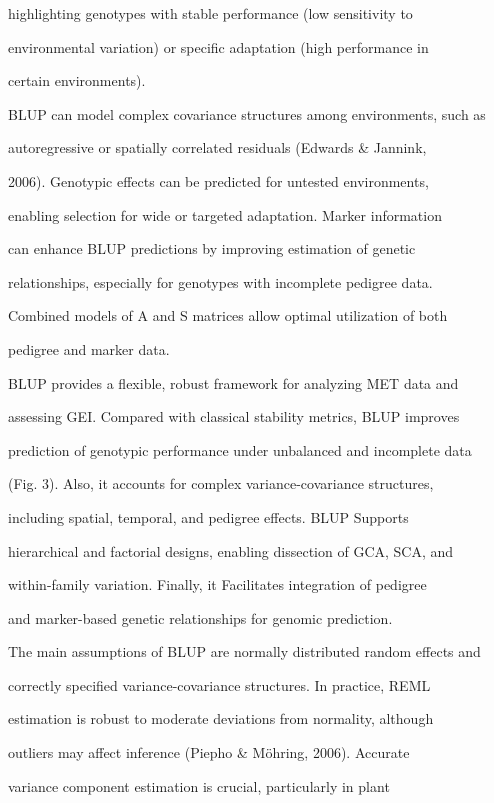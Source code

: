 \documentclass[10pt,twoside]{article}
\numberwithin{equation}{section}
\begin{document}
highlighting genotypes with stable performance (low sensitivity to

environmental variation) or specific adaptation (high performance in

certain environments).



BLUP can model complex covariance structures among environments, such as

autoregressive or spatially correlated residuals (Edwards \& Jannink,

2006). Genotypic effects can be predicted for untested environments,

enabling selection for wide or targeted adaptation. Marker information

can enhance BLUP predictions by improving estimation of genetic

relationships, especially for genotypes with incomplete pedigree data.

Combined models of A and S matrices allow optimal utilization of both

pedigree and marker data.



BLUP provides a flexible, robust framework for analyzing MET data and

assessing GEI. Compared with classical stability metrics, BLUP improves

prediction of genotypic performance under unbalanced and incomplete data

(Fig. 3). Also, it accounts for complex variance-covariance structures,

including spatial, temporal, and pedigree effects. BLUP Supports

hierarchical and factorial designs, enabling dissection of GCA, SCA, and

within-family variation. Finally, it Facilitates integration of pedigree

and marker-based genetic relationships for genomic prediction.



The main assumptions of BLUP are normally distributed random effects and

correctly specified variance-covariance structures. In practice, REML

estimation is robust to moderate deviations from normality, although

outliers may affect inference (Piepho \& Möhring, 2006). Accurate

variance component estimation is crucial, particularly in plant
\end{document}
